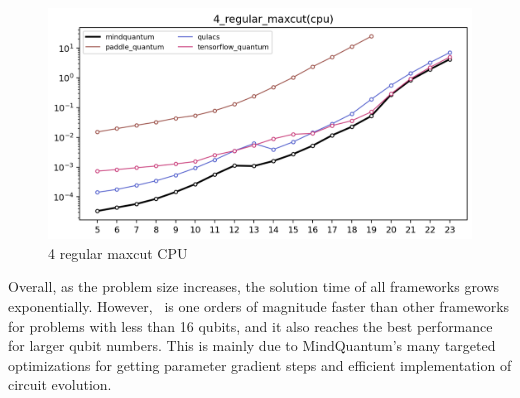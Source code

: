 \begin{figure}[htbp]
    \begin{center}
        \includegraphics[width=0.7\linewidth]{7_figures/4_regular_CPU.png}
    \end{center}
    \caption{4 regular maxcut CPU}
\end{figure}

Overall, as the problem size increases, the solution time of all frameworks grows exponentially. However, \MindQuantum\ is one orders of magnitude faster than other frameworks for problems with less than 16 qubits, and it also reaches the best performance for larger qubit numbers. This is mainly due to MindQuantum’s many targeted optimizations for getting parameter gradient steps and efficient implementation of circuit evolution.